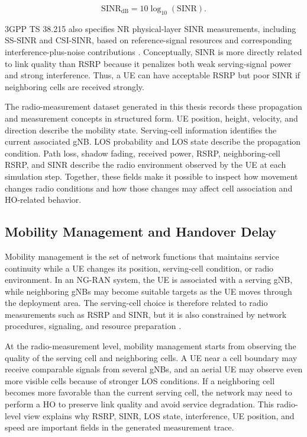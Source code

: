 \begin{equation}
    \mathrm{SINR}_{\mathrm{dB}} = 10\log_{10}(\mathrm{SINR}).
\end{equation}

3GPP TS 38.215 also specifies NR physical-layer SINR measurements, including SS-SINR and CSI-SINR, based on reference-signal resources and corresponding interference-plus-noise contributions \cite{3gpp_38215}. Conceptually, SINR is more directly related to link quality than RSRP because it penalizes both weak serving-signal power and strong interference. Thus, a UE can have acceptable RSRP but poor SINR if neighboring cells are received strongly.

The radio-measurement dataset generated in this thesis records these propagation and measurement concepts in structured form. UE position, height, velocity, and direction describe the mobility state. Serving-cell information identifies the current associated gNB. LOS probability and LOS state describe the propagation condition. Path loss, shadow fading, received power, RSRP, neighboring-cell RSRP, and SINR describe the radio environment observed by the UE at each simulation step. Together, these fields make it possible to inspect how movement changes radio conditions and how those changes may affect cell association and HO-related behavior.

\subsection{Mobility Management and Handover Delay}

Mobility management is the set of network functions that maintains service continuity while a UE changes its position, serving-cell condition, or radio environment. In an NG-RAN system, the UE is associated with a serving gNB, while neighboring gNBs may become suitable targets as the UE moves through the deployment area. The serving-cell choice is therefore related to radio measurements such as RSRP and SINR, but it is also constrained by network procedures, signaling, and resource preparation \cite{3gpp_38300,3gpp_38215}.

At the radio-measurement level, mobility management starts from observing the quality of the serving cell and neighboring cells. A UE near a cell boundary may receive comparable signals from several gNBs, and an aerial UE may observe even more visible cells because of stronger LOS conditions. If a neighboring cell becomes more favorable than the current serving cell, the network may need to perform a HO to preserve link quality and avoid service degradation. This radio-level view explains why RSRP, SINR, LOS state, interference, UE position, and speed are important fields in the generated measurement trace.

